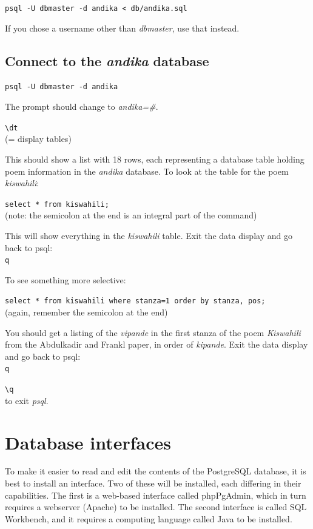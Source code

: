 \documentclass[a4paper,10pt, oneside]{book}
\begin{document}
\verb|psql -U dbmaster -d andika < db/andika.sql|

If you chose a username other than \textit{dbmaster}, use that instead.


\subsection{Connect to the \textit{andika} database}
\label{ss:connect}

\verb|psql -U dbmaster -d andika|

The prompt should change to \textit{andika=\#}. 

\verb|\dt|\\
(= display tables)

This should show a list with 18 rows, each representing a database table holding poem information in the \textit{andika} database.  To look at the table for the poem \textit{kiswahili}:

\verb|select * from kiswahili;|\\
(note: the semicolon at the end is an integral part of the command)

This will show everything in the \textit{kiswahili} table.  Exit the data display and go back to psql:\\
\verb|q|

To see something more selective:

\verb|select * from kiswahili where stanza=1 order by stanza, pos;|\\
(again, remember the semicolon at the end)

You should get a listing of the \textit{vipande} in the first stanza of the poem \textit{Kiswahili} from the Abdulkadir and Frankl paper, in order of \textit{kipande}.  Exit the data display and go back to psql:\\
\verb|q|

\verb|\q|\\
to exit \textit{psql}.


\section{Database interfaces}

To make it easier to read and edit the contents of the PostgreSQL database, it is best to install an interface.  Two of these will be installed, each differing in their capabilities.  The first is a web-based interface called phpPgAdmin, which in turn requires a webserver (Apache) to be installed.  The second interface is called SQL Workbench, and it requires a computing language called Java to be installed.
\end{document}
